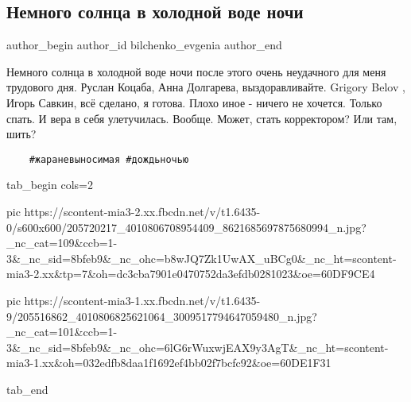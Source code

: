  
 
 
 
 
 
\subsection{Немного солнца в холодной воде ночи}
\label{sec:26_06_2021.fb.bilchenko_evgenia.1.solnce_foto}
\ifcmt
 author_begin
   author_id bilchenko_evgenia
 author_end
\fi

Немного солнца в холодной воде ночи после этого очень неудачного для меня
трудового дня. Руслан Коцаба, Анна Долгарева, выздоравливайте. Grigory Belov
, Игорь Савкин, всё сделано, я готова. Плохо иное - ничего не хочется. Только
спать. И вера в себя улетучилась. Вообще. Может, стать корректором? Или там,
шить? 

\begin{verbatim}
	#жараневыносимая #дождьночью
\end{verbatim}


\ifcmt
  tab_begin cols=2

     pic https://scontent-mia3-2.xx.fbcdn.net/v/t1.6435-0/s600x600/205720217_4010806708954409_8621685697875680994_n.jpg?_nc_cat=109&ccb=1-3&_nc_sid=8bfeb9&_nc_ohc=b8wJQ7Zk1UwAX_uBCg0&_nc_ht=scontent-mia3-2.xx&tp=7&oh=dc3cba7901e0470752da3efdb0281023&oe=60DF9CE4

     pic https://scontent-mia3-1.xx.fbcdn.net/v/t1.6435-9/205516862_4010806825621064_3009517794647059480_n.jpg?_nc_cat=101&ccb=1-3&_nc_sid=8bfeb9&_nc_ohc=6lG6rWuxwjEAX9y3AgT&_nc_ht=scontent-mia3-1.xx&oh=032edfb8daa1f1692ef4bb02f7bcfc92&oe=60DE1F31

  tab_end
\fi

